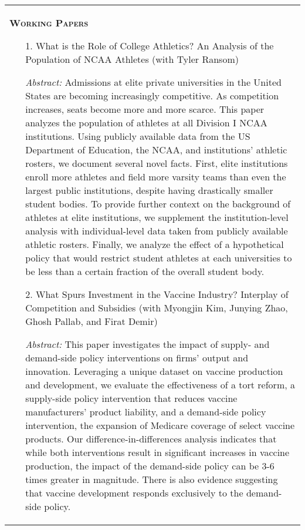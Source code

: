 \documentclass[10pt,letterpaper]{article}
\begin{document}
\begin{tabular}{p{7.5in}}

{\textsc{\textbf{Working Papers}}}

\begin{enumerate}

\item[1.]  What is the Role of College Athletics? An Analysis of the Population of NCAA Athletes (with Tyler Ransom)

\textit{Abstract:} Admissions at elite private universities in the United States are becoming increasingly competitive. As competition increases, seats become more and more scarce. This paper analyzes the population of athletes at all Division I NCAA institutions. Using publicly available data from the US Department of Education, the NCAA, and institutions' athletic rosters, we document several novel facts. First, elite institutions enroll more athletes and field more varsity teams than even the largest public institutions, despite having drastically smaller student bodies. To provide further context on the background of athletes at elite institutions, we supplement the institution-level analysis with individual-level data taken from publicly available athletic rosters. Finally, we analyze the effect of a hypothetical policy that would restrict student athletes at each universities to be less than a certain fraction of the overall student body.

\item[2.] What Spurs Investment in the Vaccine Industry? Interplay of Competition and Subsidies (with Myongjin Kim,  Junying Zhao,  Ghosh Pallab, and Firat Demir) 

\textit{Abstract: } This paper investigates the impact of supply- and demand-side policy interventions on firms' output and innovation. Leveraging a unique dataset on vaccine production and development, we evaluate the effectiveness of a tort reform, a supply-side policy intervention that reduces vaccine manufacturers' product liability, and a demand-side policy intervention, the expansion of Medicare coverage of select vaccine products. Our difference-in-differences analysis indicates that while both interventions result in significant increases in vaccine production, the impact of the demand-side policy can be 3-6 times greater in magnitude. There is also evidence suggesting that vaccine development responds exclusively to the demand-side policy. 

\end{enumerate}



\end{tabular}
\end{document}
